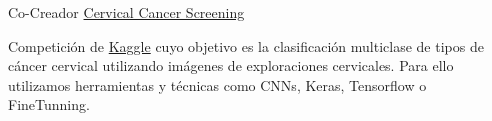 \begin{cventries}
\cventry
{Co-Creador} %
{\href{https://github.com/mmaguero/Intel-mobileodt-cervical-cancer-screening}{Cervical Cancer Screening}} %
{} %
{} %
{ %
	\begin{cvitems}
		\item {Competición de \href{https://www.kaggle.com/c/intel-mobileodt-cervical-cancer-screening}{Kaggle} cuyo objetivo es la clasificación multiclase de tipos de cáncer cervical utilizando imágenes de exploraciones cervicales. Para ello utilizamos herramientas y técnicas como CNNs, Keras, Tensorflow o FineTunning. }
	\end{cvitems}
}




\end{cventries}